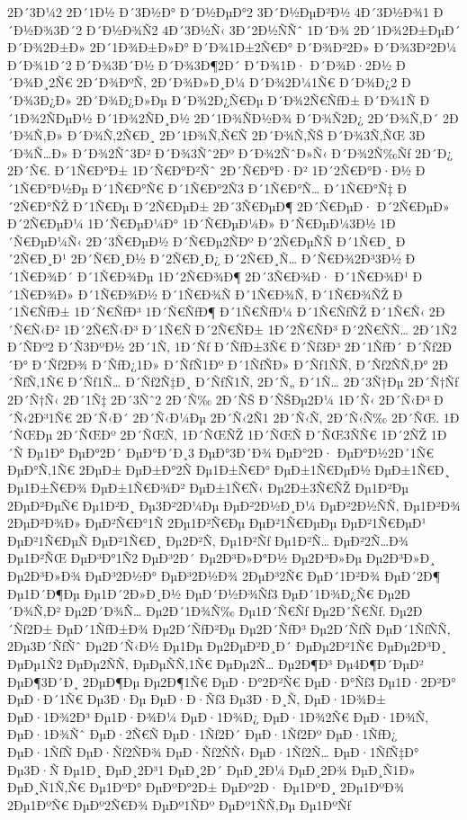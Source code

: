 {2Ð´3Ð¼2
2Ð´1Ð½
Ð´3Ð½Ð°
Ð´Ð½ÐµÐ°2
3Ð´Ð½ÐµÐ²Ð½
4Ð´3Ð½Ð¾1
Ð´Ð½Ð¾3Ð´2
Ð´Ð½Ð¾Ñ2
4Ð´3Ð½Ñ‹
3Ð´2Ð½ÑÑˆ
1Ð´Ð¾
2Ð´1Ð¾2Ð±ÐµÐ´
Ð´Ð¾2Ð±Ð»
2Ð´1Ð¾Ð±Ð»Ð°
Ð´Ð¾1Ð±2Ñ€Ð°
Ð´Ð¾Ð²2Ð»
Ð´Ð¾3Ð²2Ð¼
Ð´Ð¾1Ð´2
Ð´Ð¾3Ð´Ð½
Ð´Ð¾3Ð¶2Ð´
Ð´Ð¾1Ð·
Ð´Ð¾Ð·2Ð½
Ð´Ð¾Ð¸2Ñ€
2Ð´Ð¾ÐºÑ‚
2Ð´Ð¾Ð»Ð¸Ð¼
Ð´Ð¾2Ð¼1Ñ€
Ð´Ð¾Ð¿2
Ð´Ð¾3Ð¿Ð»
2Ð´Ð¾Ð¿Ð»Ðµ
Ð´Ð¾2Ð¿Ñ€Ðµ
Ð´Ð¾2Ñ€ÑƒÐ±
Ð´Ð¾1Ñ
Ð´1Ð¾2ÑÐµÐ½
Ð´1Ð¾2ÑÐ¸Ð½
2Ð´1Ð¾ÑÐ½Ð¾
Ð´Ð¾Ñ2Ð¿
2Ð´Ð¾Ñ‚Ð´
2Ð´Ð¾Ñ‚Ð»
Ð´Ð¾Ñ‚2Ñ€Ð¸
2Ð´1Ð¾Ñ‚Ñ€Ñ
2Ð´Ð¾Ñ‚ÑŠ
Ð´Ð¾3Ñ‚ÑŒ
3Ð´Ð¾Ñ…Ð»
Ð´Ð¾2Ñˆ3Ð²
Ð´Ð¾3Ñˆ2Ðº
Ð´Ð¾2ÑˆÐ»Ñ‹
Ð´Ð¾2Ñ‰Ñƒ
2Ð´Ð¿
2Ð´Ñ€.
Ð´1Ñ€Ð°Ð±
1Ð´Ñ€Ð°Ð²Ñˆ
2Ð´Ñ€Ð°Ð·Ð²
1Ð´2Ñ€Ð°Ð·Ð½
Ð´1Ñ€Ð°Ð½Ðµ
Ð´1Ñ€Ð°Ñ€
Ð´1Ñ€Ð°2Ñ3
Ð´1Ñ€Ð°Ñ…
Ð´1Ñ€Ð°Ñ‡
Ð´2Ñ€Ð°ÑŽ
Ð´1Ñ€Ðµ
Ð´2Ñ€ÐµÐ±
2Ð´3Ñ€ÐµÐ¶
2Ð´Ñ€ÐµÐ·
Ð´2Ñ€ÐµÐ»
Ð´2Ñ€ÐµÐ¼
1Ð´Ñ€ÐµÐ¼Ð°
1Ð´Ñ€ÐµÐ¼Ð»
Ð´Ñ€ÐµÐ¼3Ð½
1Ð´Ñ€ÐµÐ¼Ñ‹
2Ð´3Ñ€ÐµÐ½
Ð´Ñ€Ðµ2ÑÐº
Ð´2Ñ€ÐµÑÑ
Ð´1Ñ€Ð¸
Ð´2Ñ€Ð¸Ð¹
2Ð´Ñ€Ð¸Ð½
Ð´2Ñ€Ð¸Ð¿
Ð´2Ñ€Ð¸Ñ…
Ð´Ñ€Ð¾2Ð³3Ð½
Ð´1Ñ€Ð¾Ð´
Ð´1Ñ€Ð¾Ðµ
1Ð´2Ñ€Ð¾Ð¶
2Ð´3Ñ€Ð¾Ð·
Ð´1Ñ€Ð¾Ð¹
Ð´1Ñ€Ð¾Ð»
Ð´1Ñ€Ð¾Ð½
Ð´1Ñ€Ð¾Ñ
Ð´1Ñ€Ð¾Ñ‚
Ð´1Ñ€Ð¾ÑŽ
Ð´1Ñ€ÑƒÐ±
1Ð´Ñ€ÑƒÐ³
1Ð´Ñ€ÑƒÐ¶
Ð´1Ñ€ÑƒÐ¼
Ð´1Ñ€ÑƒÑŽ
Ð´1Ñ€Ñ‹
2Ð´Ñ€Ñ‹Ð²
1Ð´2Ñ€Ñ‹Ð³
Ð´1Ñ€Ñ
Ð´2Ñ€ÑÐ±
1Ð´2Ñ€ÑÐ³
Ð´2Ñ€ÑÑ…
2Ð´1Ñ2
Ð´ÑÐº2
Ð´Ñ3ÐºÐ½
2Ð´1Ñ‚
1Ð´Ñƒ
Ð´ÑƒÐ±3Ñ€
Ð´Ñƒ3Ð³
2Ð´1ÑƒÐ´
Ð´Ñƒ2Ð´Ð°
Ð´Ñƒ2Ð¾
Ð´ÑƒÐ¿1Ð»
Ð´ÑƒÑ1Ðº
Ð´1ÑƒÑÐ»
Ð´Ñƒ1ÑÑ‚
Ð´Ñƒ2ÑÑ‚Ð°
2Ð´ÑƒÑ‚1Ñ€
Ð´Ñƒ1Ñ…
Ð´Ñƒ2Ñ‡Ð¸
Ð´ÑƒÑ1Ñ‚
2Ð´Ñ„
Ð´1Ñ…
2Ð´3Ñ†Ðµ
2Ð´Ñ†Ñƒ
2Ð´Ñ†Ñ‹
2Ð´1Ñ‡
2Ð´3Ñˆ2
2Ð´Ñ‰
2Ð´ÑŠ
Ð´ÑŠÐµ2Ð¼
1Ð´Ñ‹
2Ð´Ñ‹Ð³
Ð´Ñ‹2Ð³1Ñ€
2Ð´Ñ‹Ð´
2Ð´Ñ‹Ð¼Ðµ
2Ð´Ñ‹2Ñ1
2Ð´Ñ‹Ñ‚
2Ð´Ñ‹Ñ‰
2Ð´ÑŒ.
1Ð´ÑŒÐµ
2Ð´ÑŒÐº
2Ð´ÑŒÑ‚
1Ð´ÑŒÑŽ
1Ð´ÑŒÑ
Ð´ÑŒ3ÑÑ€
1Ð´2ÑŽ
1Ð´Ñ
Ðµ1Ð°
ÐµÐ°2Ð´
ÐµÐ°Ð´Ð¸3
ÐµÐ°3Ð´Ð¾
ÐµÐ°2Ð·
ÐµÐ°Ð½2Ð´1Ñ€
ÐµÐ°Ñ‚1Ñ€
2ÐµÐ±
ÐµÐ±Ð°2Ñ
Ðµ1Ð±Ñ€Ð°
ÐµÐ±1Ñ€ÐµÐ½
ÐµÐ±1Ñ€Ð¸
Ðµ1Ð±Ñ€Ð¾
ÐµÐ±1Ñ€Ð¾Ð²
ÐµÐ±1Ñ€Ñ‹
Ðµ2Ð±3Ñ€ÑŽ
Ðµ1Ð²Ðµ
2ÐµÐ²ÐµÑ€
Ðµ1Ð²Ð¸
Ðµ3Ð²2Ð¼Ðµ
ÐµÐ²2Ð½Ð¸Ð¼
ÐµÐ²2Ð½ÑÑ‚
Ðµ1Ð²Ð¾
2ÐµÐ²Ð¾Ð»
ÐµÐ²Ñ€Ð°1Ñ
2Ðµ1Ð²Ñ€Ðµ
ÐµÐ²1Ñ€ÐµÐµ
ÐµÐ²1Ñ€ÐµÐ¹
ÐµÐ²1Ñ€ÐµÑ
ÐµÐ²1Ñ€Ð¸
Ðµ2Ð²Ñ‚
Ðµ1Ð²Ñƒ
Ðµ1Ð²Ñ…
ÐµÐ²2Ñ…Ð¾
Ðµ1Ð²ÑŒ
ÐµÐ³Ð°1Ñ2
ÐµÐ³2Ð´
Ðµ2Ð³Ð»Ð°Ð½
Ðµ2Ð³Ð»Ðµ
Ðµ2Ð³Ð»Ð¸
Ðµ2Ð³Ð»Ð¾
ÐµÐ³2Ð½Ð°
ÐµÐ³2Ð½Ð¾
2ÐµÐ³2Ñ€
ÐµÐ´1Ð²Ð¾
ÐµÐ´2Ð¶
Ðµ1Ð´Ð¶Ðµ
Ðµ1Ð´2Ð»Ð¸Ð½
ÐµÐ´Ð½Ð¾Ñƒ3
ÐµÐ´1Ð¾Ð¿Ñ€
Ðµ2Ð´Ð¾Ñ‚Ð²
Ðµ2Ð´Ð¾Ñ…
Ðµ2Ð´1Ð¾Ñ‰
Ðµ1Ð´Ñ€Ñƒ
Ðµ2Ð´Ñ€Ñƒ.
Ðµ2Ð´Ñƒ2Ð±
ÐµÐ´1ÑƒÐ±Ð¾
Ðµ2Ð´ÑƒÐ²Ðµ
Ðµ2Ð´ÑƒÐ³
Ðµ2Ð´ÑƒÑ
ÐµÐ´1ÑƒÑÑ‚
2Ðµ3Ð´ÑƒÑˆ
Ðµ2Ð´Ñ‹Ð½
Ðµ1Ðµ
Ðµ2ÐµÐ²Ð¸Ð´
ÐµÐµ2Ð²1Ñ€
ÐµÐµ2Ð³Ð¸
ÐµÐµ1Ñ2
ÐµÐµ2ÑÑ‚
ÐµÐµÑÑ‚1Ñ€
ÐµÐµ2Ñ…
Ðµ2Ð¶Ð³
Ðµ4Ð¶Ð´ÐµÐ²
ÐµÐ¶3Ð´Ð¸
2ÐµÐ¶Ðµ
Ðµ2Ð¶1Ñ€
ÐµÐ·Ð°2Ð²Ñ€
ÐµÐ·Ð°Ñƒ3
Ðµ1Ð·2Ð²Ð°
ÐµÐ·Ð´1Ñ€
Ðµ3Ð·Ðµ
ÐµÐ·Ð·Ñƒ3
Ðµ3Ð·Ð¸Ñ‚
ÐµÐ·1Ð¾Ð±
ÐµÐ·1Ð¾2Ð³
Ðµ1Ð·Ð¾Ð¼
ÐµÐ·1Ð¾Ð¿
ÐµÐ·1Ð¾2Ñ€
ÐµÐ·1Ð¾Ñ‚
ÐµÐ·1Ð¾Ñˆ
ÐµÐ·2Ñ€Ñ
ÐµÐ·1Ñƒ2Ð´
ÐµÐ·1Ñƒ2Ðº
ÐµÐ·1ÑƒÐ¿
ÐµÐ·1ÑƒÑ
ÐµÐ·Ñƒ2ÑÐ¾
ÐµÐ·Ñƒ2ÑÑ‹
ÐµÐ·1Ñƒ2Ñ…
ÐµÐ·1ÑƒÑ‡Ð°
Ðµ3Ð·Ñ
Ðµ1Ð¸
ÐµÐ¸2Ð³1
ÐµÐ¸2Ð´
ÐµÐ¸2Ð¼
ÐµÐ¸2Ð¾
ÐµÐ¸Ñ1Ð»
ÐµÐ¸Ñ1Ñ‚Ñ€
Ðµ1ÐºÐ°
ÐµÐºÐ°2Ð±
ÐµÐº2Ð·
Ðµ1ÐºÐ¸
2Ðµ1ÐºÐ¾
2Ðµ1ÐºÑ€
ÐµÐº2Ñ€Ð¾
ÐµÐº1ÑÐº
ÐµÐº1ÑÑ‚Ðµ
Ðµ1ÐºÑƒ
}
